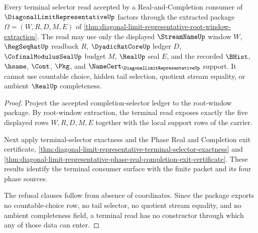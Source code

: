 \begin{theorem}
\label{thm:diagonal-limit-representative-selector-choice-refusal}
Every terminal selector read accepted by a Real-and-Completion consumer of $\DiagonalLimitRepresentativeUp$ factors through the extracted package $\Omega=(W,R,D,M,E)$ of \autoref{thm:diagonal-limit-representative-root-window-extraction}. The read may use only the displayed $\StreamNameUp$ window $W$, $\RegSeqRatUp$ readback $R$, $\DyadicRatCoreUp$ ledger $D$, $\CofinalModulusSealUp$ budget $M$, $\RealUp$ seal $E$, and the recorded $\BHist$, $\hsame$, $\Cont$, $\Pkg$, and $\NameCert_{\DiagonalLimitRepresentativeUp}$ support. It cannot use countable choice, hidden tail selection, quotient stream equality, or ambient $\RealUp$ completeness.
\end{theorem}
\begin{proof}
Project the accepted completion-selector ledger to the root-window package. By root-window extraction, the terminal read exposes exactly the five displayed rows $W,R,D,M,E$ together with the local support rows of the carrier.

Next apply terminal-selector exactness and the Phase Real and Completion exit certificate, \autoref{thm:diagonal-limit-representative-terminal-selector-exactness} and \autoref{thm:diagonal-limit-representative-phase-real-completion-exit-certificate}. These results identify the terminal consumer surface with the finite packet and its four phase sources.

The refusal clauses follow from absence of coordinates. Since the package exports no countable-choice row, no tail selector, no quotient stream equality, and no ambient completeness field, a terminal read has no constructor through which any of those data can enter.
\end{proof}

